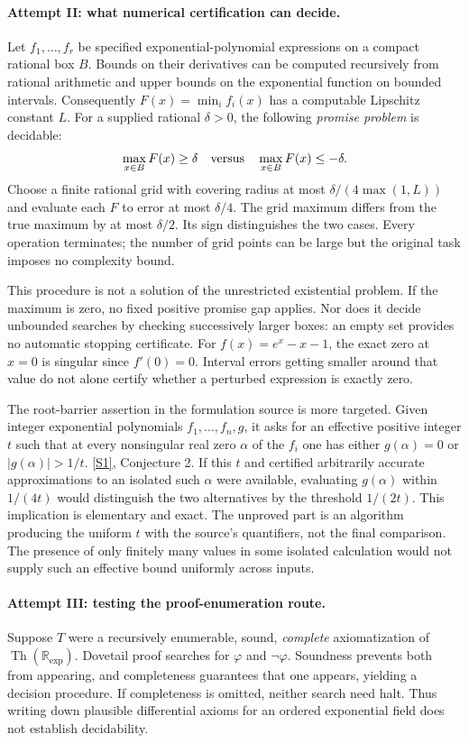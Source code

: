 \documentclass[11pt,a4paper]{article}
\newcommand{\R}{\mathbb{R}}
\newcommand{\sref}[2]{\hyperlink{source:#1:#2}{[S#2]}}
\numberwithin{equation}{section}
\begin{document}
\paragraph{Attempt II: what numerical certification can decide.}
Let $f_1,\ldots,f_r$ be specified exponential-polynomial expressions on
a compact rational box $B$.  Bounds on their derivatives can be
computed recursively from rational arithmetic and upper bounds on the
exponential function on bounded intervals.  Consequently
$F(x)=\min_i f_i(x)$ has a computable Lipschitz constant $L$.
For a supplied rational $\delta>0$, the following \emph{promise problem}
is decidable:
\[
 \max_{x\in B}F(x)\geq\delta
 \quad\hbox{versus}\quad
 \max_{x\in B}F(x)\leq-\delta.
\]
Choose a finite rational grid with covering radius at most
$\delta/(4\max(1,L))$ and evaluate each $F$ to error at most
$\delta/4$.  The grid maximum differs from the true maximum by at
most $\delta/2$.  Its sign distinguishes the two cases.  Every
operation terminates; the number of grid points can be large but the
original task imposes no complexity bound.

This procedure is not a solution of the unrestricted existential
problem.  If the maximum is zero, no fixed positive promise gap applies.
Nor does it decide unbounded searches by checking successively larger
boxes: an empty set provides no automatic stopping certificate.
For $f(x)=e^x-x-1$, the exact zero at $x=0$ is singular since $f'(0)=0$.
Interval errors getting smaller around that value do not alone certify
whether a perturbed expression is exactly zero.

The root-barrier assertion in the formulation source is more targeted.
Given integer exponential polynomials $f_1,\ldots,f_n,g$, it asks for
an effective positive integer $t$ such that at every nonsingular real
zero $\alpha$ of the $f_i$ one has either $g(\alpha)=0$ or
$|g(\alpha)|>1/t$. \sref{1462}{1}, Conjecture 2.
If this $t$ and certified arbitrarily accurate approximations to an
isolated such $\alpha$ were available, evaluating $g(\alpha)$ within
$1/(4t)$ would distinguish the two alternatives by the threshold
$1/(2t)$.  This implication is elementary and exact.  The unproved
part is an algorithm producing the uniform $t$ with the source's
quantifiers, not the final comparison.  The presence of only finitely
many values in some isolated calculation would not supply such an
effective bound uniformly across inputs.

\paragraph{Attempt III: testing the proof-enumeration route.}
Suppose $T$ were a recursively enumerable, sound, \emph{complete}
axiomatization of $\operatorname{Th}(\R_{\exp})$.  Dovetail proof
searches for $\varphi$ and $\neg\varphi$.  Soundness prevents both from
appearing, and completeness guarantees that one appears, yielding a
decision procedure.  If completeness is omitted, neither search need
halt.  Thus writing down plausible differential axioms for an ordered
exponential field does not establish decidability.
\end{document}
